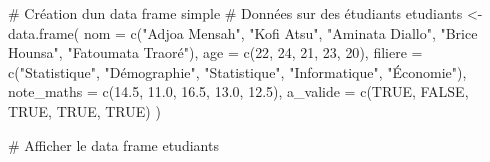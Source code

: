 \documentclass[
  french,
  11pt,
  a4paper,
]{article}
\newenvironment{Shaded}{}{}
\newcommand{\AttributeTok}[1]{\textcolor[rgb]{0.84,0.23,0.29}{#1}}
\newcommand{\CommentTok}[1]{\textcolor[rgb]{0.42,0.45,0.49}{#1}}
\newcommand{\ConstantTok}[1]{\textcolor[rgb]{0.00,0.36,0.77}{#1}}
\newcommand{\DecValTok}[1]{\textcolor[rgb]{0.00,0.36,0.77}{#1}}
\newcommand{\FloatTok}[1]{\textcolor[rgb]{0.00,0.36,0.77}{#1}}
\newcommand{\FunctionTok}[1]{\textcolor[rgb]{0.44,0.26,0.76}{#1}}
\newcommand{\NormalTok}[1]{\textcolor[rgb]{0.14,0.16,0.18}{#1}}
\newcommand{\OtherTok}[1]{\textcolor[rgb]{0.44,0.26,0.76}{#1}}
\newcommand{\StringTok}[1]{\textcolor[rgb]{0.01,0.18,0.38}{#1}}
\begin{document}
\begin{Shaded}
\begin{Highlighting}[]
\CommentTok{\# Création d\textquotesingle{}un data frame simple}
\CommentTok{\# Données sur des étudiants}
\NormalTok{etudiants }\OtherTok{\textless{}{-}} \FunctionTok{data.frame}\NormalTok{(}
  \AttributeTok{nom =} \FunctionTok{c}\NormalTok{(}\StringTok{"Adjoa Mensah"}\NormalTok{, }\StringTok{"Kofi Atsu"}\NormalTok{, }\StringTok{"Aminata Diallo"}\NormalTok{, }\StringTok{"Brice Hounsa"}\NormalTok{, }\StringTok{"Fatoumata Traoré"}\NormalTok{),}
  \AttributeTok{age =} \FunctionTok{c}\NormalTok{(}\DecValTok{22}\NormalTok{, }\DecValTok{24}\NormalTok{, }\DecValTok{21}\NormalTok{, }\DecValTok{23}\NormalTok{, }\DecValTok{20}\NormalTok{),}
  \AttributeTok{filiere =} \FunctionTok{c}\NormalTok{(}\StringTok{"Statistique"}\NormalTok{, }\StringTok{"Démographie"}\NormalTok{, }\StringTok{"Statistique"}\NormalTok{, }\StringTok{"Informatique"}\NormalTok{, }\StringTok{"Économie"}\NormalTok{),}
  \AttributeTok{note\_maths =} \FunctionTok{c}\NormalTok{(}\FloatTok{14.5}\NormalTok{, }\FloatTok{11.0}\NormalTok{, }\FloatTok{16.5}\NormalTok{, }\FloatTok{13.0}\NormalTok{, }\FloatTok{12.5}\NormalTok{),}
  \AttributeTok{a\_valide =} \FunctionTok{c}\NormalTok{(}\ConstantTok{TRUE}\NormalTok{, }\ConstantTok{FALSE}\NormalTok{, }\ConstantTok{TRUE}\NormalTok{, }\ConstantTok{TRUE}\NormalTok{, }\ConstantTok{TRUE}\NormalTok{)}
\NormalTok{)}

\CommentTok{\# Afficher le data frame}
\NormalTok{etudiants}
\end{Highlighting}
\end{Shaded}

 
  \providecommand{\huxb}[2]{\arrayrulecolor[RGB]{#1}\global\arrayrulewidth=#2pt}
  \providecommand{\huxvb}[2]{\color[RGB]{#1}\vrule width #2pt}
  \providecommand{\huxtpad}[1]{\rule{0pt}{#1}}
  \providecommand{\huxbpad}[1]{\rule[-#1]{0pt}{#1}}
\end{document}
